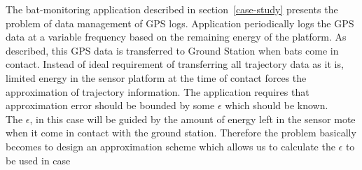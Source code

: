 \documentclass[conference]{IEEEtran}
\begin{document}
The bat-monitoring application described in section~\ref{case-study} presents the problem of data management 
of GPS logs. Application periodically logs the GPS data at a variable frequency based on the remaining energy 
of the platform. As described, this GPS data is transferred to Ground Station when bats come in contact. 
Instead of ideal requirement of transferring all trajectory data as it is, limited energy in the sensor 
platform at the time of contact forces the approximation of trajectory information. The application requires 
that approximation error should be bounded by some $\epsilon$ which should be known.\\
The $\epsilon$, in this case will be guided by the amount of energy left in the sensor mote when it come in 
contact with the ground station. Therefore the problem basically becomes to design an approximation scheme 
which allows us to calculate the $\epsilon$ to be used in case 

\end{document}
